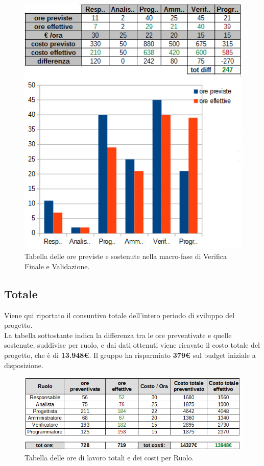 \begin{figure}[H]
\begin{center}
\includegraphics[scale=0.70]{img/consuntivo-verival-tot.jpg}
\caption{Tabella delle ore previste e sostenute nella macro-fase di Verifica Finale e Validazione.}
\end{center}
\end{figure}








\clearpage
\subsection{Totale}
Viene qui riportato il consuntivo totale dell'intero periodo di sviluppo del progetto. \\
\linebreak
La tabella sottostante indica la differenza tra le ore preventivate e quelle sostenute, suddivise per ruolo, e dai dati ottenuti viene ricavato il costo totale del progetto, che è di \textbf{13.948€}. Il gruppo ha risparmiato \textbf{379€} sul budget iniziale a disposizione.
\begin{figure}[H]
\begin{center}
\includegraphics[scale=0.70]{img/tot-ruoli.jpg}
\caption{Tabella delle ore di lavoro totali e dei costi per Ruolo.}
\end{center}
\end{figure}

